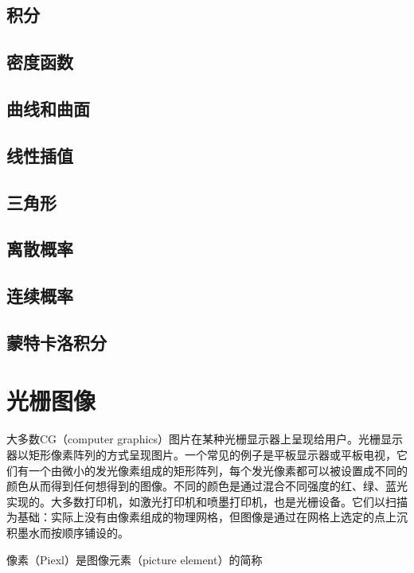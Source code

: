 \documentclass[lang=cn,12pt]{elegantbook}
\begin{document}
\section{积分}

\section{密度函数}

\section{曲线和曲面}

\section{线性插值}

\section{三角形}

\section{离散概率}

\section{连续概率}

\section{蒙特卡洛积分}

\chapter{光栅图像}

大多数CG（computer graphics）图片在某种光栅显示器上呈现给用户。光栅显示器以矩形像素阵列的方式呈现图片。一个常见的例子是平板显示器或平板电视，它们有一个由微小的发光像素组成的矩形阵列，每个发光像素都可以被设置成不同的颜色从而得到任何想得到的图像。不同的颜色是通过混合不同强度的红、绿、蓝光实现的。大多数打印机，如激光打印机和喷墨打印机，也是光栅设备。它们以扫描为基础：实际上没有由像素组成的物理网格，但图像是通过在网格上选定的点上沉积墨水而按顺序铺设的。

\begin{note}
  像素（Piexl）是图像元素（picture element）的简称
\end{note}
\end{document}
